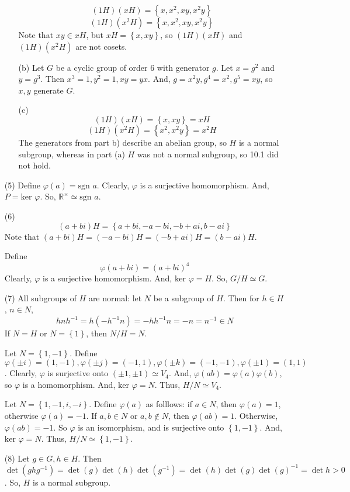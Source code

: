 \documentclass[12pt]{article}
\begin{document}
\begin{itemize}
\begin{itemize}
$$(1H)(xH) = \left\lbrace x, x^2, xy, x^2y \right\rbrace$$
$$(1H)(x^2H) = \left\lbrace x, x^2, xy, x^2y \right\rbrace$$
Note that $xy \in xH$, but $xH = \left\lbrace x, xy \right\rbrace$, so $(1H)(xH)$ and $(1H)(x^2H)$ are not cosets.
\item[(b)]
Let $G$ be a cyclic group of order 6 with generator $g$. Let $x = g^2$ and $y = g^3$. Then $x^3 = 1, y^2 = 1, xy = yx$. And, $g = x^2y, g^4 = x^2, g^5 = xy$, so $x, y$ generate $G$.
\item[(c)]
$$(1H)(xH) = \left\lbrace x, xy \right\rbrace = xH$$
$$(1H)(x^2H) = \left\lbrace x^2, x^2y \right\rbrace = x^2H$$
The generators from part b) describe an abelian group, so $H$ is a normal subgroup, whereas in part (a) $H$ was not a normal subgroup, so 10.1 did not hold.
\end{itemize}
\item[(5)]
Define $\varphi(a) = \text{sgn }a$. Clearly, $\varphi$ is a surjective homomorphism. And, $P = \text{ker }\varphi$. So, $\mathbb{R}^\times \simeq \text{sgn }a$.
\item[(6)]
$$(a + bi)H = \left\lbrace a+bi, -a-bi, -b + ai, b - ai \right\rbrace$$
Note that $(a+bi)H = (-a-bi)H = (-b+ai)H = (b-ai)H$.

Define 
$$\varphi(a + bi) = (a+bi)^4$$
Clearly, $\varphi$ is a surjective homomorphism. And, $\text{ker }\varphi = H$. So, $G/H \simeq G$.
\item[(7)]
All subgroups of $H$ are normal: let $N$ be a subgroup of $H$. Then for $h \in H$, $n \in N$,
$$hnh^{-1} = h(-h^{-1}n) = -hh^{-1}n = -n = n^{-1} \in N$$
If $N = H$ or $N = \left\lbrace 1 \right\rbrace$, then $N/H = N$.

Let $N = \left\lbrace 1, -1 \right\rbrace$. Define $\varphi(\pm i) = (1, -1), \varphi(\pm j) = (-1, 1), \varphi(\pm k) = (-1, -1), \varphi(\pm 1) = (1, 1)$. Clearly, $\varphi$ is surjective onto $(\pm 1, \pm 1) \simeq V_4$. And, $\varphi(ab) = \varphi(a)\varphi(b)$, so $\varphi$ is a homomorphism. And, $\text{ker }\varphi = N$. Thus, $H/N \simeq V_4$.

Let $N = \left\lbrace 1, -1, i, -i \right\rbrace$. Define $\varphi(a)$ as folllows: if $a \in N$, then $\varphi(a) = 1$, otherwise $\varphi(a) = -1$. If $a, b \in N$ or $a, b \not \in N$, then $\varphi(ab) = 1$. Otherwise, $\varphi(ab) = -1$. So $\varphi$ is an isomorphism, and is surjective onto $\left\lbrace 1, -1 \right\rbrace$. And, $\text{ker }\varphi = N$. Thus, $H/N \simeq \left\lbrace 1, -1 \right\rbrace$.
\item[(8)]
Let $g \in G, h \in H$. Then $\det(ghg^{-1}) = \det(g)\det(h)\det(g^{-1}) = \det(h)\det(g)\det(g)^{-1} = \det{h} > 0$. So, $H$ is a normal subgroup.


\end{itemize}
\end{document}
